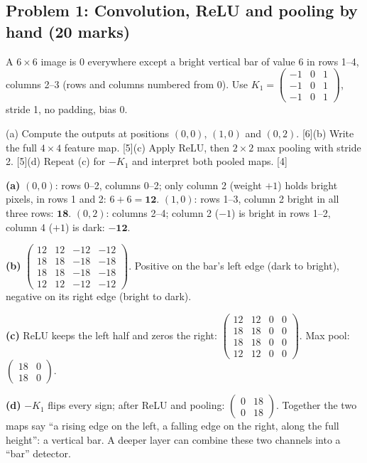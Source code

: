 \documentclass[11pt]{article}
\begin{document}
\subsection{Problem 1: Convolution, ReLU and pooling by hand \normalfont\small\color{GreyN}(20 marks)}

\begin{prob}A $6\times6$ image is 0 everywhere except a bright vertical bar of value 6 in rows 1--4, columns 2--3 (rows and columns numbered from 0). Use $K_1=\begin{pmatrix}-1&0&1\\-1&0&1\\-1&0&1\end{pmatrix}$, stride 1, no padding, bias 0.

(a) Compute the outputs at positions $(0,0)$, $(1,0)$ and $(0,2)$. [6]\newline (b) Write the full $4\times4$ feature map. [5]\newline (c) Apply ReLU, then $2\times2$ max pooling with stride 2. [5]\newline (d) Repeat (c) for $-K_1$ and interpret both pooled maps. [4]\end{prob}

\begin{soln}\textbf{(a)} $(0,0)$: rows 0--2, columns 0--2; only column 2 (weight $+1$) holds bright pixels, in rows 1 and 2: $6+6=\mathbf{12}$. $(1,0)$: rows 1--3, column 2 bright in all three rows: $\mathbf{18}$. $(0,2)$: columns 2--4; column 2 ($-1$) is bright in rows 1--2, column 4 ($+1$) is dark: $\mathbf{-12}$.

\textbf{(b)} $\begin{pmatrix}12&12&-12&-12\\18&18&-18&-18\\18&18&-18&-18\\12&12&-12&-12\end{pmatrix}$. Positive on the bar's left edge (dark to bright), negative on its right edge (bright to dark).

\textbf{(c)} ReLU keeps the left half and zeros the right: $\begin{pmatrix}12&12&0&0\\18&18&0&0\\18&18&0&0\\12&12&0&0\end{pmatrix}$. Max pool: $\begin{pmatrix}18&0\\18&0\end{pmatrix}$.

\textbf{(d)} $-K_1$ flips every sign; after ReLU and pooling: $\begin{pmatrix}0&18\\0&18\end{pmatrix}$. Together the two maps say ``a rising edge on the left, a falling edge on the right, along the full height'': a vertical bar. A deeper layer can combine these two channels into a ``bar'' detector.\end{soln}
\end{document}
